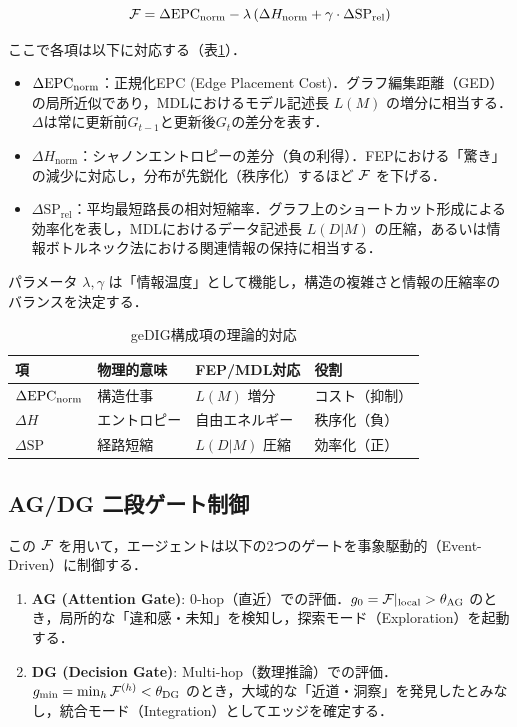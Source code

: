 \begin{equation}
\mathcal{F} = \Delta\mathrm{EPC}_{\mathrm{norm}} - \lambda \left( \Delta H_{\mathrm{norm}} + \gamma \cdot \Delta \mathrm{SP}_{\mathrm{rel}} \right)
\label{eq:gedig}
\end{equation}

ここで各項は以下に対応する（表\ref{tab:gedig_terms}）．
\begin{itemize}
\item $\Delta\mathrm{EPC}_{\mathrm{norm}}$：正規化EPC (Edge Placement Cost)．グラフ編集距離（GED）の局所近似であり，MDLにおけるモデル記述長 $L(M)$ の増分に相当する．$\Delta$は常に更新前$G_{t-1}$と更新後$G_t$の差分を表す．
\item $\Delta H_{\mathrm{norm}}$：シャノンエントロピーの差分（負の利得）．FEPにおける「驚き」の減少に対応し，分布が先鋭化（秩序化）するほど $\mathcal{F}$ を下げる．
\item $\Delta \mathrm{SP}_{\mathrm{rel}}$：平均最短路長の相対短縮率．グラフ上のショートカット形成による効率化を表し，MDLにおけるデータ記述長 $L(D|M)$ の圧縮，あるいは情報ボトルネック法\cite{tishby2000}における関連情報の保持に相当する．
\end{itemize}

パラメータ $\lambda, \gamma$ は「情報温度」として機能し，構造の複雑さと情報の圧縮率のバランスを決定する．

\begin{table}[t]
\centering
\caption{geDIG構成項の理論的対応}
\label{tab:gedig_terms}
\small
\begin{tabular}{llll}
\toprule
項 & 物理的意味 & FEP/MDL対応 & 役割 \\
\midrule
$\Delta\mathrm{EPC}_{\mathrm{norm}}$ & 構造仕事 & $L(M)$ 増分 & コスト（抑制） \\
$\Delta H$ & エントロピー & 自由エネルギー & 秩序化（負） \\
$\Delta \mathrm{SP}$ & 経路短縮 & $L(D|M)$ 圧縮 & 効率化（正） \\
\bottomrule
\end{tabular}
\end{table}

\subsection{AG/DG 二段ゲート制御}
この $\mathcal{F}$ を用いて，エージェントは以下の2つのゲートを事象駆動的（Event-Driven）に制御する．
\begin{enumerate}
\item \textbf{AG (Attention Gate)}: 0-hop（直近）での評価．$g_0 = \mathcal{F}|_{\mathrm{local}} > \theta_{\mathrm{AG}}$ のとき，局所的な「違和感・未知」を検知し，探索モード（Exploration）を起動する．
\item \textbf{DG (Decision Gate)}: Multi-hop（数理推論）での評価．$g_{\min} = \min_h \mathcal{F}^{(h)} < \theta_{\mathrm{DG}}$ のとき，大域的な「近道・洞察」を発見したとみなし，統合モード（Integration）としてエッジを確定する．
\end{enumerate}

